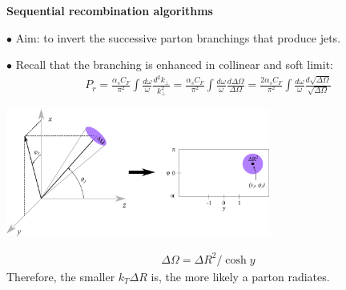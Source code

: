 \documentclass[9pt,a4paper,unknownkeysallowed,xcolor=dvipsnames,aspectratio=43]{beamer}
\begin{document}
\begin{frame}{\bf\huge Sequential recombination algorithms}

{\color{darkred}\Large$\bullet$} Aim: to invert the successive parton branchings that produce jets.\\
\vspace{2mm}

{\color{darkred}\Large$\bullet$} Recall that the branching is enhanced in collinear and soft limit:
\begin{align}
    P_r=\frac{\alpha_s C_F}{\pi^2}\int\frac{d\omega}{\omega}\frac{d^2k_\perp}{k_\perp^2} = \frac{\alpha_s C_F}{\pi^2}\int\frac{d\omega}{\omega}\frac{d\Delta \Omega}{\Delta \Omega}=\frac{2\alpha_s C_F}{\pi^2}\int\frac{d\omega}{\omega}\frac{d\sqrt{\Delta \Omega}}{\sqrt{\Delta \Omega}}
\end{align}
\begin{center}
\includegraphics[width=0.65\textwidth]{R.png}
\end{center}
\begin{align}
\Delta \Omega = \Delta R^2/\cosh y    
\end{align}
Therefore, the smaller $k_T \Delta R$ is, the more likely a parton radiates.
\end{frame}
%
%
\end{document}

